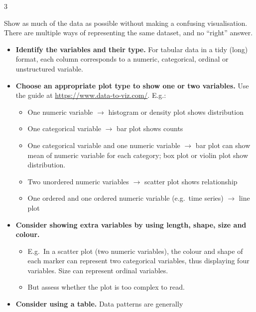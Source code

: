 \documentclass[10pt]{article}
\newlength{\calloutparindent}
\newenvironment{callout}[2][standard]{
  \setlength{\calloutparindent}{\parindent}
  \begin{tcolorbox}[enhanced jigsaw,
    leftrule=.15mm, toprule=.15mm,
    colframe=quarto-callout-#1-color-frame, opacityback=0,
    colback=white, coltitle=black, rightrule=.15mm, breakable,
    colbacktitle=quarto-callout-#1-color!50!white,
    opacitybacktitle=0.6, titlerule=0mm, left=1mm,right=1mm,
    title=\textcolor{quarto-callout-#1-color}{\expandafter\csname
      quartocallout#1icon\endcsname}{\textbf{#2}},
    drop shadow,
    bottomrule=.15mm, toptitle=1mm, arc=.35mm, bottomtitle=1mm,
    before=\par\medskip]%
    \setlength{\parindent}{\calloutparindent}\noindent\ignorespaces}%
  {\end{tcolorbox}}
\newcommand{\principle}[3]{\begin{callout}{#1}\raggedright#2\tcblower\raggedright#3\end{callout}}
\begin{document}
\setlength{\columnsep}{5pt}
\begin{multicols}{3}
  \principle{Principle 1: Show the data}%
  {Show as much of the data as possible without making a confusing
    visualisation. There are multiple ways of representing the same
    dataset, and no ``right'' answer.}%
{\begin{itemize}[itemsep=1ex]
\item \textbf{Identify the variables and their type.} For tabular data
  in a tidy (long) format, each column corresponds to a numeric,
  categorical, ordinal or unstructured variable.
\item
  \textbf{Choose an appropriate plot type to show one or two
    variables.}
  Use the guide at \url{https://www.data-to-viz.com/}. E.g.:
  \begin{itemize}[topsep=0pt]
  \item One numeric variable $\rightarrow$ histogram or density plot
    shows distribution
  \item One categorical variable $\rightarrow$ bar plot
    shows counts
  \item One categorical variable and one numeric variable
    $\rightarrow$ bar plot can show mean of numeric variable for each
    category; box plot or violin plot show distribution.
  \item Two unordered numeric variables $\rightarrow$ scatter plot
    shows relationship
  \item One ordered and one ordered numeric variable (e.g.~time series)
    $\rightarrow$ line plot
  \end{itemize}
\item
  \textbf{Consider showing extra variables by using length, shape,
    size and colour.}
  \begin{itemize}
  \item E.g.~In a scatter plot (two numeric variables), the colour and
    shape of each marker can represent two categorical variables, thus
    displaying four variables. Size can represent ordinal variables.
  \item But assess whether the plot is too complex to read.
  \end{itemize}
\item \textbf{Consider using a table.} Data patterns are generally

\end{itemize}}
\end{multicols}
\end{document}
